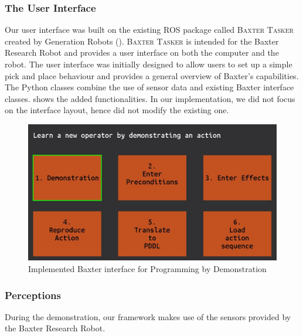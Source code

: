 \subsubsection{The User Interface}
Our user interface was built on the existing ROS package called \textsc{Baxter Tasker} created by Generation Robots (\cite{BaxterTasker}).
\textsc{Baxter Tasker} is intended for the Baxter Research Robot and provides a user interface on both the computer and the robot.
The user interface was initially designed to allow users to set up a simple pick and place behaviour and provides a general overview of Baxter's capabilities.
The Python classes combine the use of sensor data and existing Baxter interface classes.
 shows the added functionalities.
In our implementation, we did not focus on the interface layout, hence did not modify the existing one.

\begin{figure}[h]
	\centering
	\includegraphics[scale=0.5]{figures/interface}
	\caption{Implemented Baxter interface for Programming by Demonstration}
	\label{fig:interface}
\end{figure}


\subsubsection{Perceptions}
During the demonstration, our framework makes use of the sensors provided by the Baxter Research Robot.

